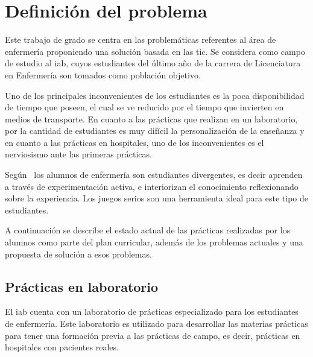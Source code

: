 \section{Definición del problema}


Este trabajo de grado se centra en las problemáticas referentes al área de
enfermería proponiendo una solución basada en las \gls{tic}. Se considera como
campo de estudio al \gls{iab}, cuyos estudiantes del último año de la carrera de
Licenciatura en Enfermería son tomados como población objetivo.

Uno de los principales inconvenientes de los estudiantes es la poca
disponibilidad de tiempo que poseen, el cual se ve reducido por el tiempo que
invierten en medios de transporte\cite{iab:tesis_alumnos}. En cuanto a las
prácticas que realizan en un laboratorio, por la cantidad de estudiantes es muy
difícil la personalización de la enseñanza\cite{iab:tesis_alumnos} y en cuanto a
las prácticas en hospitales, uno de los inconvenientes es el nerviosismo ante las
primeras prácticas.

Según~\cite{humphreys2013developing} los alumnos de enfermería son estudiantes
divergentes, es decir aprenden a través de experimentación activa, e
interiorizan el conocimiento reflexionando sobre la experiencia. Los juegos
serios son una herramienta ideal para este tipo de
estudiantes\cite{humphreys2013developing}. 

A continuación se describe el estado actual de las prácticas realizadas por los
alumnos como parte del plan curricular, además de los problemas actuales y una
propuesta de solución a esos problemas.

\subsection{Prácticas en laboratorio}

El \gls{iab} cuenta con un laboratorio de prácticas especializado para los
estudiantes de enfermería. Este laboratorio es utilizado para desarrollar las
materias prácticas para tener una formación previa a las prácticas de
campo, es decir, prácticas en hospitales con pacientes reales.

